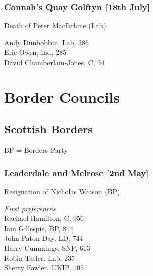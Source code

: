\documentclass[a4paper,openany,10pt]{book}
\begin{document}
\subsubsection*{Connah's Quay Golftyn \hspace*{\fill}\nolinebreak[1]%
\enspace\hspace*{\fill}
[18th July]}


Death of Peter Macfarlane (Lab).



Andy Dunbobbin, Lab, 386\\
Eric Owen, Ind, 285\\
David Chamberlain-Jones, C, 34\\


\vfill

\section{Border Councils}

\subsection*{Scottish Borders}

BP = Borders Party

\subsubsection*{Leaderdale and Melrose \hspace*{\fill}\nolinebreak[1]%
\enspace\hspace*{\fill}
[2nd May]}


Resignation of Nicholas Watson (BP).



\emph{First preferences}\\
Rachael Hamilton, C, 956\\
Iain Gillespie, BP, 814\\
John Paton Day, LD, 744\\
Harry Cummings, SNP, 613\\
Robin Tatler, Lab, 235\\
Sherry Fowler, UKIP, 105\\
\end{document}
